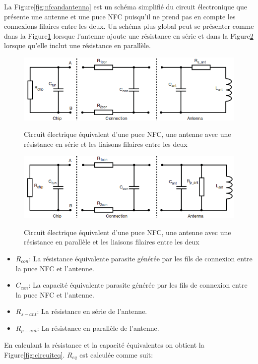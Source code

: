 \documentclass{themeensg}
\begin{document}
La Figure\ref{fig:nfcandantenna} est un schéma simplifié du circuit électronique que présente une antenne et une puce NFC puisqu'il ne prend pas en compte les connexions filaires entre les deux. Un schéma plus global peut se présenter comme dans la Figure\ref{fig:completeeq} lorsque l'antenne ajoute une résistance en série et dans la Figure\ref{fig:completeeq2} lorsque qu'elle inclut une résistance en parallèle.

\begin{figure}[h!]
\includegraphics[scale=0.7]{images/chipANDantennaANDconn.png}
\label{fig:completeeq}
\caption{Circuit électrique équivalent d'une puce NFC, une antenne avec une résistance en série et les liaisons filaires entre les deux}
\end{figure}

\begin{figure}[h!]
\includegraphics[scale=0.7]{images/withPARA.png}
\label{fig:completeeq2}
\caption{Circuit électrique équivalent d'une puce NFC, une antenne avec une résistance en parallèle et les liaisons filaires entre les deux}
\end{figure}
\begin{itemize}
\item $R_{con}$: La résistance équivalente parasite générée par les fils de connexion entre la puce NFC et l'antenne.
\item $C_{con}$: La capacité équivalente parasite générée par les fils de connexion entre la puce NFC et l'antenne.
\item $R_{s-ant}$: La résistance en série de l'antenne.
\item $R_{p-ant}$: La résistance en parallèle de l'antenne.
\end{itemize}
En calculant la résistance et la capacité équivalentes on obtient la Figure\ref{fig:circuiteq}. $R_{eq}$ est calculée comme suit:
\end{document}
